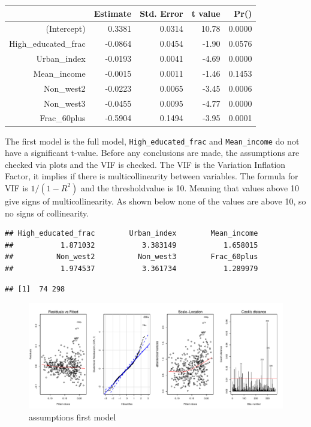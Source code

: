 \documentclass[11pt,]{article}
\begin{document}
\begin{table}[ht]
\centering
\begin{tabular}{rrrrr}
  \hline
 & Estimate & Std. Error & t value & Pr() \\ 
  \hline
(Intercept) & 0.3381 & 0.0314 & 10.78 & 0.0000 \\ 
  High\_educated\_frac & -0.0864 & 0.0454 & -1.90 & 0.0576 \\ 
  Urban\_index & -0.0193 & 0.0041 & -4.69 & 0.0000 \\ 
  Mean\_income & -0.0015 & 0.0011 & -1.46 & 0.1453 \\ 
  Non\_west2 & -0.0223 & 0.0065 & -3.45 & 0.0006 \\ 
  Non\_west3 & -0.0455 & 0.0095 & -4.77 & 0.0000 \\ 
  Frac\_60plus & -0.5904 & 0.1494 & -3.95 & 0.0001 \\ 
   \hline
\end{tabular}
\end{table}

The first model is the full model, \texttt{High\_educated\_frac} and
\texttt{Mean\_income} do not have a significant t-value. Before any
conclusions are made, the assumptions are checked via plots and the VIF
is checked. The VIF is the Variation Inflation Factor, it implies if
there is multicollinearity between variables. The formula for VIF is
\(1/(1-R^2)\) and the thresholdvalue is 10. Meaning that values above 10
give signs of multicollinearity. As shown below none of the values are
above 10, so no signs of collinearity.

\begin{verbatim}
## High_educated_frac        Urban_index        Mean_income 
##           1.871032           3.383149           1.658015 
##          Non_west2          Non_west3        Frac_60plus 
##           1.974537           3.361734           1.289979
\end{verbatim}

\begin{verbatim}
## [1]  74 298
\end{verbatim}

\begin{figure}[H]

{\centering \includegraphics{Report_files/figure-latex/unnamed-chunk-8-1} 

}

\caption{\label{afm}assumptions first model}\label{fig:unnamed-chunk-8}
\end{figure}
\end{document}

